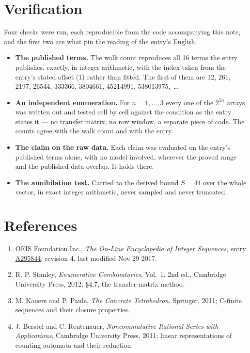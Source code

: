 \documentclass[11pt]{article}
\theoremstyle{definition}
\begin{document}
\section{Verification}

Four checks were run, each reproducible from the code accompanying this note, and the first two are what pin the reading of the entry's English.

\begin{itemize}

\item {\bfseries The published terms.} The walk count reproduces all 16 terms the entry publishes, exactly, in integer arithmetic, with the index taken from the entry's stated offset (1) rather than fitted. The first of them are 12, 261, 2197, 26544, 333366, 3804661, 45214991, 538013975,~\dots

\item {\bfseries An independent enumeration.} For $n = 1,\dots,3$ every one of the $2^{5n}$ arrays was written out and tested cell by cell against the condition as the entry states it --- no transfer matrix, no row window, a separate piece of code. The counts agree with the walk count and with the entry.

\item {\bfseries The claim on the raw data.} Each claim was evaluated on the entry's published terms alone, with no model involved, wherever the proved range and the published data overlap. It holds there.

\item {\bfseries The annihilation test.} Carried to the derived bound $S = 44$ over the whole vector, in exact integer arithmetic, never sampled and never truncated.

\end{itemize}

\section{References}

\begin{enumerate}

\item OEIS Foundation Inc., \emph{The On-Line Encyclopedia of Integer Sequences}, entry \href{https://oeis.org/A295844}{A295844}, revision 4, last modified Nov 29 2017.

\item R. P. Stanley, \emph{Enumerative Combinatorics}, Vol.~1, 2nd ed., Cambridge University Press, 2012; \S4.7, the transfer-matrix method.

\item M. Kauers and P. Paule, \emph{The Concrete Tetrahedron}, Springer, 2011; C-finite sequences and their closure properties.

\item J. Berstel and C. Reutenauer, \emph{Noncommutative Rational Series with Applications}, Cambridge University Press, 2011; linear representations of counting automata and their reduction.

\end{enumerate}
\end{document}
